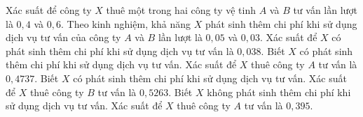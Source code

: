 \begin{ex}
Xác suất để công ty $X$ thuê một trong hai công ty vệ tinh $A$ và $B$ tư vấn lần lượt là $0{,}4$ và $0{,}6$. Theo kinh nghiệm, khả năng $X$ phát sinh thêm chi phí khi sử dụng dịch vụ tư vấn của công ty $A$ và $B$ lần lượt là $0{,}05$ và $0{,}03$.
\choiceTF
{\True Xác suất để $X$ có phát sinh thêm chi phí khi sử dụng dịch vụ tư vấn là $0{,}038$.}
{Biết $X$ có phát sinh thêm chi phí khi sử dụng dịch vụ tư vấn. Xác suất để $X$ thuê công ty $A$ tư vấn là $0{,}4737$.}
{Biết $X$ có phát sinh thêm chi phí khi sử dụng dịch vụ tư vấn. Xác suất để $X$ thuê công ty $B$ tư vấn là $0{,}5263$.}
{\True Biết $X$ không phát sinh thêm chi phí khi sử dụng dịch vụ tư vấn. Xác suất để $X$ thuê công ty $A$ tư vấn là $0{,}395$.}
\end{ex}
